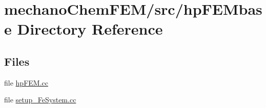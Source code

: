 \section{mechano\+Chem\+F\+E\+M/src/hp\+F\+E\+Mbase Directory Reference}
\label{dir_f9631a46b8da6706fb7cd09bbe3d9ebd}
\subsection*{Files}
\begin{DoxyCompactItemize}
\item 
file \mbox{\hyperlink{hp_f_e_m_8cc}{hp\+F\+E\+M.\+cc}}
\item 
file \mbox{\hyperlink{setup___fe_system_8cc}{setup\+\_\+\+Fe\+System.\+cc}}
\end{DoxyCompactItemize}
